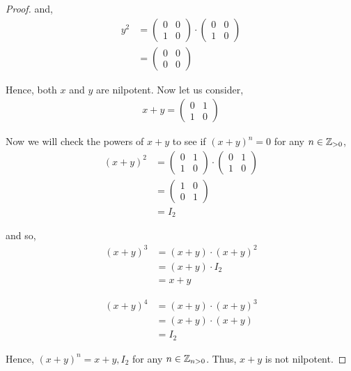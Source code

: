 \documentclass[11pt, reqno]{amsart}
\theoremstyle{plain}
\theoremstyle{definition}
\theoremstyle{example}
\begin{document}
\begin{enumerate}[1.]
\begin{enumerate}[(a)]
\begin{proof}
and,
\begin{align*}
y^2 &= \begin{pmatrix} 0 & 0 \\ 1 & 0 \end{pmatrix} \cdot \begin{pmatrix} 0 & 0 \\ 1 & 0 \end{pmatrix}\\
&= \begin{pmatrix} 0 & 0 \\ 0 & 0 \end{pmatrix}
\end{align*}

Hence, both $x$ and $y$ are nilpotent. Now let us consider,
\begin{align*}
x + y = \begin{pmatrix} 0 & 1 \\ 1 & 0 \end{pmatrix}
\end{align*}

Now we will check the powers of $x+y$ to see if $(x+y)^n = 0$ for any $n \in \mathbb{Z}_{>0}$,
\begin{align*}
(x + y)^2 &= \begin{pmatrix} 0 & 1 \\ 1 & 0 \end{pmatrix} \cdot \begin{pmatrix} 0 & 1 \\ 1 & 0 \end{pmatrix}\\
&= \begin{pmatrix} 1 & 0 \\ 0 & 1 \end{pmatrix}\\
&= I_2
\end{align*}

and so,
\begin{align*}
(x + y)^3 &= (x + y) \cdot (x + y)^2\\
&= (x  + y) \cdot I_2\\
&= x + y
\end{align*}

\begin{align*}
(x + y)^4 &= (x + y) \cdot (x + y)^3\\
&= (x  + y) \cdot (x + y)\\
&= I_2
\end{align*}

Hence, $(x + y)^n = x + y, I_2$ for any $n \in \mathbb{Z}_{n > 0}$. Thus, $x + y$ is not nilpotent.
\end{proof}
\end{enumerate}



\end{enumerate}
\end{document}
